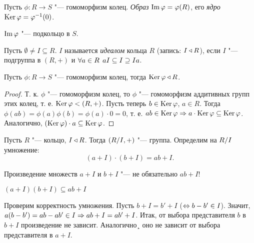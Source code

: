 \documentclass[main]{subfiles}
\begin{document}
\begin{definition}
  Пусть \( \phi : R \to S \) "--- гомоморфизм колец.
  \emph{Образ} \( \operatorname{Im} \varphi = \varphi(R) \), его
  \emph{ядро} \( \operatorname{Ker} \varphi = \varphi^{-1}(0) \).
\end{definition}
\begin{remark}
  \( \operatorname{Im} \varphi \) "--- подкольцо в \( S \).
\end{remark}

\begin{definition}
  Пусть \( \emptyset \ne I \subseteq R \).
  \( I \) называется \emph{идеалом} кольца
  \( R \) (запись: \( I \triangleleft R \)),
  если \( I \) "--- подгруппа в \( (R, +) \)
  и \( \forall {a \in R} \; \, a I \subseteq I \supseteq Ia \).
\end{definition}

\begin{proposition}
  Пусть \( \phi : R \to S \) "--- гомоморфизм колец, тогда
  \( \operatorname{Ker} \varphi \triangleleft R \).
\end{proposition}
\begin{proof}
  Т. к. \( \phi \) "--- гомоморфизм колец, то \( \phi \) "---
  гомоморфизм аддитивных групп этих колец, т. е.
  \( \operatorname{Ker} \varphi < (R, +) \).
  Пусть теперь \( b \in \operatorname{Ker} \varphi \), \( a \in R \).
  Тогда \( \phi(ab) = \phi(a) \phi(b) = \phi(a) \cdot 0 = 0 \),
  т. е. \( ab \in \operatorname{Ker} \varphi \Rightarrow a \cdot \operatorname{Ker} \varphi \subseteq \operatorname{Ker} \varphi \).
  Аналогично, \( (\operatorname{Ker} \varphi) \cdot a \subseteq \operatorname{Ker} \varphi \).
\end{proof}

Пусть \( R \) "--- кольцо, \( I \triangleleft R \).
Тогда \( (\Factor{R}[I], +) \) "--- группа.
Определим на \( \Factor{R}[I] \) умножение:
\[
  (a + I) \cdot (b + I) = ab + I.
\]

\begin{remark}
  Произведение множеств \( a + I \) и \( b + I \) "---
  не обязательно \( ab + I \)!
\end{remark}
\begin{exercise}
  \( (a + I)(b + I) \subseteq ab + I \)
\end{exercise}

Проверим корректность умножения.
Пусть \( b + I = b' + I \) (\( \Leftrightarrow b - b' \in I \)).
Значит, \( a(b - b') = ab - ab' \in I \Rightarrow
ab + I = ab' + I \). Итак, от выбора представителя
\( b \) в \( b + I \) произведение не зависит.
Аналогично¸ оно не зависит от выбора представителя
в \( a + I \).
\end{document}
